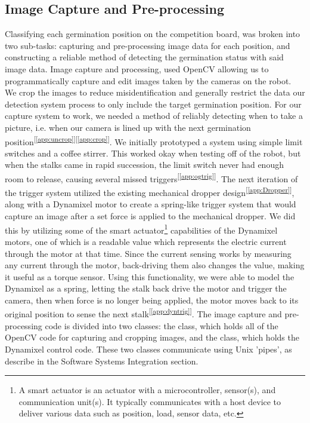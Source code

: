 \documentclass[11pt, hidelinks]{report}
\newcommand{\refapp}[1]{\textsuperscript{[\ref{#1}]}}
\begin{document}
\subsection{Image Capture and Pre-processing}
Classifying each germination position on the competition board, was broken into two sub-tasks: capturing and pre-processing image data for each position, and constructing a reliable method of detecting the germination status with said image data. Image capture and processing, used OpenCV allowing us to programmatically capture and edit images taken by the cameras on the robot. We crop the images to reduce misidentification and generally restrict the data our detection system process to only include the target germination position. For our capture system to work, we needed a method of reliably detecting when to take a picture, i.e. when our camera is lined up with the next germination position\refapp{app:uncrop}\refapp{app:crop}. We initially prototyped a system using simple limit switches and a coffee stirrer. This worked okay when testing off of the robot, but when the stalks came in rapid succession, the limit switch never had enough room to release, causing several missed triggers\refapp{app:ogtrig}. The next iteration of the trigger system utilized the existing mechanical dropper design\refapp{app:Dropper}, along with a Dynamixel motor to create a spring-like trigger system that would capture an image after a set force is applied to the mechanical dropper. We did this by utilizing some of the smart actuator\footnote{A smart actuator is an actuator with a microcontroller, sensor(s), and communication unit(s). It typically communicates with a host device to deliver various data such as position, load, sensor data, etc.} capabilities of the Dynamixel motors, one of which is a readable  value which represents the electric current through the motor at that time. Since the current sensing works by measuring any current through the motor, back-driving them also changes the  value, making it useful as a torque sensor. Using this functionality, we were able to model the Dynamixel as a spring, letting the stalk back drive the motor and trigger the camera, then when force is no longer being applied, the motor moves back to its original position to sense the next stalk\refapp{app:dyntrig}. The image capture and pre-processing code is divided into two classes: the  class, which holds all of the OpenCV code for capturing and cropping images, and the  class, which holds the Dynamixel control code. These two classes communicate using Unix 'pipes', as describe in the Software Systems Integration section.
\end{document}
